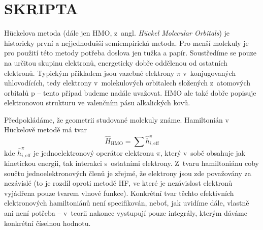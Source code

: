 


\vspace{5cm}
\section*{SKRIPTA}
H\"{u}ckelova metoda (dále jen HMO, z~angl. \textit{H\"{u}ckel Molecular Orbitals}) je historicky první a nejjednodušší semiempirická metoda. Pro menší molekuly je pro použití této metody potřeba doslova jen tužka a papír. Soustředíme se pouze na určitou skupinu elektronů, energeticky dobře oddělenou od ostatních elektronů. Typickým příkladem jsou vazebné elektrony $\pi$ v~konjugovaných uhlovodících, tedy elektrony v~molekulových orbitalech složených z~atomových orbitalů p -- tento případ budeme nadále uvažovat. HMO ale také dobře popisuje elektronovou strukturu ve valenčním pásu alkalických kovů. 
 
 
Předpokládáme, že geometrii studované molekuly známe. Hamiltonián v H\"{u}ckelově metodě má tvar
\begin{equation}
\hat{H}_{\mathrm{HMO}}= \sum \hat{h}_{i, \mathrm{eff}}^\pi
\label{rov:semiemp:ham}
\end{equation}
kde $\hat{h}_{i, \mathrm{eff}}^\pi$ je jednoelektronový operátor elektronu $\pi$, který v~sobě obsahuje jak kinetickou energii, tak interakci s~ostatními elektrony.
Z~tvaru hamiltoniánu coby součtu jednoelektronových členů je zřejmé, že elektrony jsou zde považovány za nezávislé (to je rozdíl oproti metodě HF, ve které je nezávislost elektronů vyjádřena pouze tvarem vlnové funkce). 
Konkrétní tvar těchto efektivních elektronových hamiltoniánů není specifikován, neboť, jak uvidíme dále, vlastně ani není potřeba -- v~teorii nakonec vystupují pouze integrály, kterým dáváme konkrétní číselnou hodnotu. 

